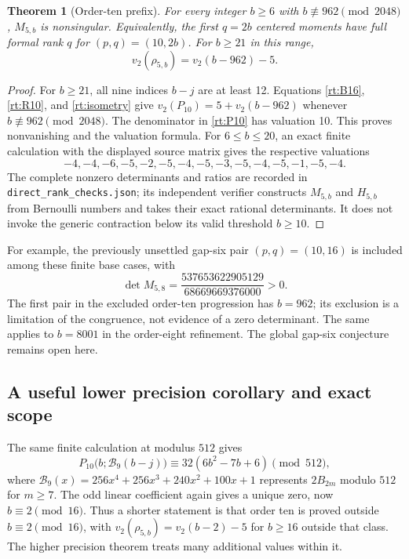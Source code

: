\documentclass[11pt,a4paper]{article}
\numberwithin{equation}{section}
\newtheorem{theorem}{Theorem}[section]
\theoremstyle{definition}
\theoremstyle{remark}
\begin{document}
\begin{theorem}[Order-ten prefix]\label{rt:rank10}
For every integer $b\ge6$ with $b\not\equiv962\pmod{2048}$,
$M_{5,b}$ is nonsingular. Equivalently, the first $q=2b$ centered
moments have full formal rank $q$ for $(p,q)=(10,2b)$. For $b\ge21$
in this range,
\[
              v_2(\rho_{5,b})=v_2(b-962)-5.
\]
\end{theorem}
\begin{proof}
For $b\ge21$, all nine indices $b-j$ are at least 12. Equations
\eqref{rt:B16}, \eqref{rt:R10}, and \eqref{rt:isometry} give
$v_2(P_{10})=5+v_2(b-962)$ whenever $b\not\equiv962\pmod{2048}$.
The denominator in \eqref{rt:P10} has valuation 10. This proves
nonvanishing and the valuation formula.
For $6\le b\le20$, an exact finite calculation with the displayed
source matrix gives the respective valuations
\[
 -4,-4,-6,-5,-2,-5,-4,-5,-3,-5,-4,-5,-1,-5,-4.
\]
The complete nonzero determinants and ratios are recorded in
\texttt{direct\_rank\_checks.json}; its independent verifier constructs
$M_{5,b}$ and $H_{5,b}$ from Bernoulli numbers and takes their exact
rational determinants. It does not invoke the generic contraction
below its valid threshold $b\ge10$.
\end{proof}

For example, the previously unsettled gap-six pair $(p,q)=(10,16)$
is included among these finite base cases, with
\[
 \det M_{5,8}=\frac{537653622905129}{68669669376000}>0.
\]
The first pair in the excluded order-ten progression has $b=962$;
its exclusion is a limitation of the congruence, not evidence of a
zero determinant. The same applies to $b=8001$ in the order-eight
refinement. The global gap-six conjecture remains open here.

\subsection{A useful lower precision corollary and exact scope}

The same finite calculation at modulus $512$ gives
\[
 P_{10}\bigl(b;\mathcal B_9(b-j)\bigr)
 \equiv32(6b^2-7b+6)\pmod{512},
\]
where
$\mathcal B_9(x)=256x^4+256x^3+240x^2+100x+1$
represents $2B_{2m}$ modulo $512$ for $m\ge7$. The odd linear
coefficient again gives a unique zero, now $b\equiv2\pmod{16}$.
Thus a shorter statement is that order ten is proved outside
$b\equiv2\pmod{16}$, with
$v_2(\rho_{5,b})=v_2(b-2)-5$ for $b\ge16$ outside that class.
The higher precision theorem treats many additional values within it.
\end{document}
